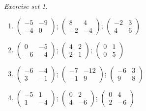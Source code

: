 \par\noindent\emph{Exercise set 1.}\nopagebreak
\begin{enumerate}[label=\arabic*., leftmargin=*, itemsep=1pt]
\item $\left(\begin{smallmatrix}-5 & -9\\ -4 & 0\end{smallmatrix}\right)$; $\left(\begin{smallmatrix}8 & 4\\ -2 & -4\end{smallmatrix}\right)$; $\left(\begin{smallmatrix}-2 & 3\\ 4 & 6\end{smallmatrix}\right)$
\item $\left(\begin{smallmatrix}0 & -5\\ -6 & -4\end{smallmatrix}\right)$; $\left(\begin{smallmatrix}4 & 2\\ 2 & 1\end{smallmatrix}\right)$; $\left(\begin{smallmatrix}0 & 1\\ 0 & 5\end{smallmatrix}\right)$
\item $\left(\begin{smallmatrix}-6 & -4\\ 3 & -1\end{smallmatrix}\right)$; $\left(\begin{smallmatrix}-7 & -12\\ -1 & 9\end{smallmatrix}\right)$; $\left(\begin{smallmatrix}-6 & 3\\ 9 & 8\end{smallmatrix}\right)$
\item $\left(\begin{smallmatrix}-5 & 1\\ 1 & -4\end{smallmatrix}\right)$; $\left(\begin{smallmatrix}0 & 2\\ 4 & -6\end{smallmatrix}\right)$; $\left(\begin{smallmatrix}0 & 4\\ 2 & -6\end{smallmatrix}\right)$

\end{enumerate}
